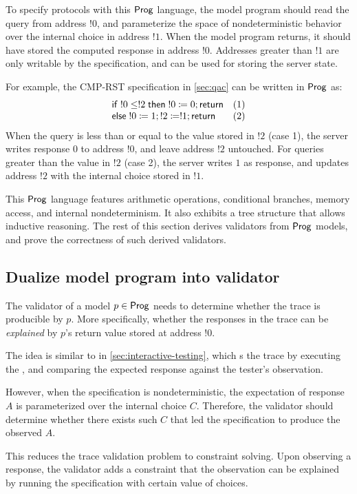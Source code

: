 To specify protocols with this $\mathsf{Prog}$ language, the model program should read
the query from address $!0$, and parameterize the space of nondeterministic
behavior over the internal choice in address $!1$.  When the model program
returns, it should have stored the computed response in address $!0$.  Addresses
greater than $!1$ are only writable by the specification, and can be used for
storing the server state.

For example, the CMP-RST specification in \autoref{sec:qac} can be written in
$\mathsf{Prog}$ as:
\[\begin{array}{ll}
\mathsf{if}\; !0\le!2\;\mathsf{then}\; !0\coloneqq0;\mathsf{return}&(1)\\
\mathsf{else}\;!0\coloneqq1;!2\coloneqq!1;\mathsf{return}&(2)
\end{array}\]
When the query is less than or equal to the value stored in $!2$ (case 1), the
server writes response $0$ to address $!0$, and leave address $!2$ untouched.
For queries greater than the value in $!2$ (case 2), the server writes $1$ as
response, and updates address $!2$ with the internal choice stored in $!1$.

This $\mathsf{Prog}$ language features arithmetic operations, conditional branches,
memory access, and internal nondeterminism.  It also exhibits a tree structure
that allows inductive reasoning.  The rest of this section derives validators
from $\mathsf{Prog}$ models, and prove the correctness of such derived validators.

\subsection{Dualize model program into validator}
\label{sec:dualize-prog}
The validator of a model $p\in\mathsf{Prog}$ needs to determine whether the trace is
producible by $p$.  More specifically, whether the responses in the trace can be
{\em explained} by $p$'s return value stored at address $!0$.

The idea is similar to  in \autoref{sec:interactive-testing}, which
s the trace by executing the , and comparing the
expected response against the tester's observation.

However, when the specification is nondeterministic, the expectation of response
$A$ is parameterized over the internal choice $C$.  Therefore, the validator
should determine whether there exists such $C$ that led the specification to
produce the observed $A$.

This reduces the trace validation problem to constraint solving.  Upon observing
a response, the validator adds a constraint that the observation can be
explained by running the specification with certain value of choices.

